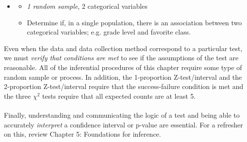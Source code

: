 \begin{itemize}
\item {}
\begin{itemize}\vspace{-2mm}
\setlength{\itemsep}{0mm}
\item \emph{1 random sample}, 2 categorical variables
\item Determine if, in a single population, there is an association between two categorical variables; e.g. grade level and favorite class.
\end{itemize}

\end{itemize}
Even when the data and data collection method correspond to a particular test, we must \emph{verify that conditions are met} to see if the assumptions of the test are reasonable.  All of the inferential procedures of this chapter require some type of random sample or process.  In addition, the 1-proportion Z-test/interval and the 2-proportion Z-test/interval require that the success-failure condition is met and the three $\chi^2$ tests require that all expected counts are at least 5.
\\
\\
Finally, understanding and communicating the logic of a test and being able to accurately \emph{interpret} a confidence interval or p-value are essential.  For a refresher on this, review Chapter 5: Foundations for inference.